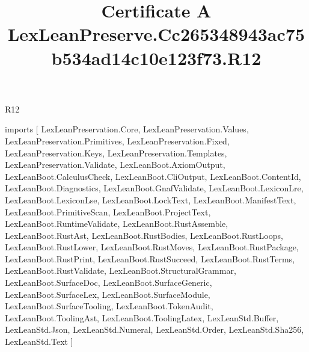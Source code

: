 \begin{lexlean}{R12}
\title{Certificate A LexLeanPreserve.Cc265348943ac75b534ad14c10e123f73.R12}
\begin{coremodule}
imports [
  LexLeanPreservation.Core,
  LexLeanPreservation.Values,
  LexLeanPreservation.Primitives,
  LexLeanPreservation.Fixed,
  LexLeanPreservation.Keys,
  LexLeanPreservation.Templates,
  LexLeanPreservation.Validate,
  LexLeanBoot.AxiomOutput,
  LexLeanBoot.CalculusCheck,
  LexLeanBoot.CliOutput,
  LexLeanBoot.ContentId,
  LexLeanBoot.Diagnostics,
  LexLeanBoot.GnafValidate,
  LexLeanBoot.LexiconLre,
  LexLeanBoot.LexiconLse,
  LexLeanBoot.LockText,
  LexLeanBoot.ManifestText,
  LexLeanBoot.PrimitiveScan,
  LexLeanBoot.ProjectText,
  LexLeanBoot.RuntimeValidate,
  LexLeanBoot.RustAssemble,
  LexLeanBoot.RustAst,
  LexLeanBoot.RustBodies,
  LexLeanBoot.RustLoops,
  LexLeanBoot.RustLower,
  LexLeanBoot.RustMoves,
  LexLeanBoot.RustPackage,
  LexLeanBoot.RustPrint,
  LexLeanBoot.RustSucceed,
  LexLeanBoot.RustTerms,
  LexLeanBoot.RustValidate,
  LexLeanBoot.StructuralGrammar,
  LexLeanBoot.SurfaceDoc,
  LexLeanBoot.SurfaceGeneric,
  LexLeanBoot.SurfaceLex,
  LexLeanBoot.SurfaceModule,
  LexLeanBoot.SurfaceTooling,
  LexLeanBoot.TokenAudit,
  LexLeanBoot.ToolingAst,
  LexLeanBoot.ToolingLatex,
  LexLeanStd.Buffer,
  LexLeanStd.Json,
  LexLeanStd.Numeral,
  LexLeanStd.Order,
  LexLeanStd.Sha256,
  LexLeanStd.Text
]


\end{coremodule}
\end{lexlean}
